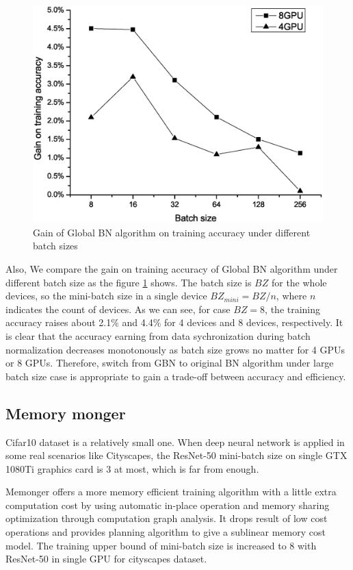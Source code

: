 \begin{figure}[!hbp]
    \centering
    \includegraphics[width=0.8\linewidth]{figure/accVsBz.eps}
    \caption{Gain of Global BN algorithm on training accuracy under different batch sizes}
    \label{fig:accVsBz}
    \end{figure}

Also, We compare the gain on training accuracy of Global BN algorithm under different batch size as the figure \ref{fig:accVsBz} shows. The batch size is $BZ$ for the whole devices, so the mini-batch size in a single device $BZ_{mini}=BZ/n$, where $n$ indicates the count of devices. 
As we can see, for case $BZ=8$, the training accuracy raises about 2.1$\%$ and 4.4$\%$ for 4 devices and 8 devices, respectively. It is clear that the accuracy earning from data sychronization during batch normalization decreases monotonously as batch size grows no matter for 4 GPUs or 8 GPUs. Therefore, switch from GBN to original BN algorithm under 
large batch size case is appropriate to gain a trade-off between accuracy and efficiency.

\subsection{Memory monger}

Cifar10 dataset is a relatively small one. When deep neural network is applied in some real scenarios like Cityscapes,  the ResNet-50 mini-batch size on single GTX 1080Ti graphics card is 3 at most, which is far from enough. 

Memonger\cite{tianqichen-memonger} offers a more memory efficient training algorithm with a little extra computation cost by using automatic in-place operation and memory sharing optimization through computation graph analysis. It drops result of low cost operations and provides planning algorithm to give a sublinear memory cost model. The training upper bound of mini-batch size is increased to 8 with ResNet-50 in single GPU for cityscapes dataset.

